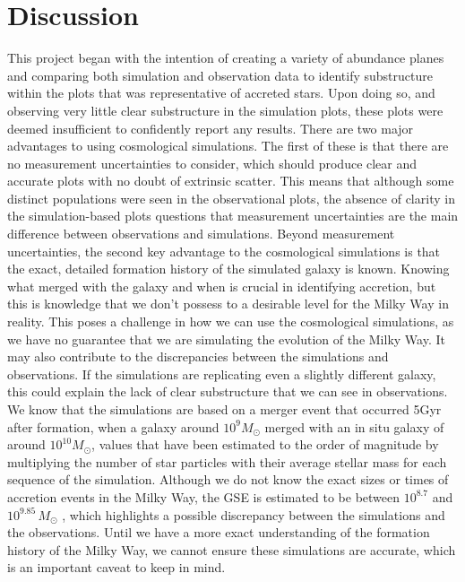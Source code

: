 \documentclass[fleqn,usenatbib]{mnras}
\begin{document}
\section{Discussion} \label{sec:discussion}

This project began with the intention of creating a variety of abundance planes and comparing both simulation and observation data to identify substructure within the plots that was representative of accreted stars. Upon doing so, and observing very little clear substructure in the simulation plots, these plots were deemed insufficient to confidently report any results. There are two major advantages to using cosmological simulations. The first of these is that there are no measurement uncertainties to consider, which should produce clear and accurate plots with no doubt of extrinsic scatter. This means that although some distinct populations were seen in the observational plots, the absence of clarity in the simulation-based plots questions that measurement uncertainties are the main difference between observations and simulations.   
Beyond measurement uncertainties, the second key advantage to the cosmological simulations is that the exact, detailed formation history of the simulated galaxy is known. Knowing what merged with the galaxy and when is crucial in identifying accretion, but this is knowledge that we don't possess to a desirable level for the Milky Way in reality. This poses a challenge in how we can use the cosmological simulations, as we have no guarantee that we are simulating the evolution of the Milky Way. It may also contribute to the discrepancies between the simulations and observations. If the simulations are replicating even a slightly different galaxy, this could explain the lack of clear substructure that we can see in observations. We know that the simulations are based on a merger event that occurred 5Gyr after formation, when a galaxy around $10^9 M_{\odot}$ merged with an in situ galaxy of around $10^{10} M_{\odot}$, values that have been estimated to the order of magnitude by multiplying the number of star particles with their average stellar mass for each sequence of the simulation. Although we do not know the exact sizes or times of accretion events in the Milky Way, the GSE is estimated to be between $10^{8.7}$ and $10^{9.85}\,M_{\odot}$ \citep{Helmi2018,Naidu2020}, which highlights a possible discrepancy between the simulations and the observations. Until we have a more exact understanding of the formation history of the Milky Way, we cannot ensure these simulations are accurate, which is an important caveat to keep in mind.   
\end{document}
